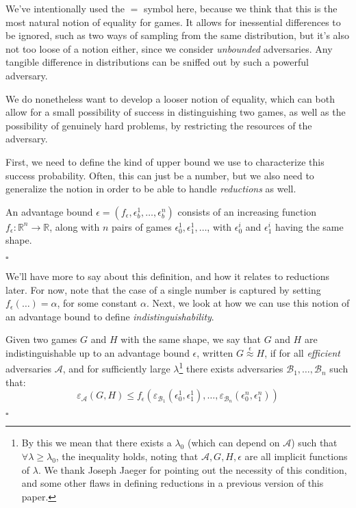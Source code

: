 We've intentionally used the $=$ symbol here, because we think that
this is the most natural notion of equality for games.
It allows for inessential differences to be ignored,
such as two ways of sampling from the same distribution,
but it's also not too loose of a notion either, since we consider
\emph{unbounded} adversaries.
Any tangible difference in distributions can be sniffed out by
such a powerful adversary.

We do nonetheless want to develop a looser notion of equality,
which can both allow for a small possibility of success
in distinguishing two games, as well as the possibility of genuinely
hard problems, by restricting the resources of the adversary.

First, we need to define the kind of upper bound we use
to characterize this success probability.
Often, this can just be a number, but we also need to generalize
the notion in order to be able to handle \emph{reductions} as well.

\begin{definition}
    An advantage bound $\epsilon = (f_\epsilon, \epsilon_b^1, \ldots, \epsilon_b^n)$
    consists of an increasing function $f_\epsilon : \mathbb{R}^n \to \mathbb{R}$,
    along with $n$ pairs of games $\epsilon^1_0, \epsilon^1_1, \ldots$, with
    $\epsilon^i_0$ and $\epsilon^i_1$ having the same shape.

    $\square$
\end{definition}

We'll have more to say about this definition, and how it relates to reductions
later.
For now, note that the case of a single number is captured by setting
$f_\epsilon(\ldots) = \alpha$, for some constant $\alpha$.
Next, we look at how we can use this notion of an advantage bound
to define \emph{indistinguishability}.

\begin{definition}
    Given two games $G$ and $H$ with the same shape,
    we say that $G$ and $H$ are indistinguishable up to an advantage bound $\epsilon$,
    written ${G \overset{\epsilon}{\approx} H}$, if for all \emph{efficient}
    adversaries $\mathcal{A}$, and for sufficiently large $\lambda$\footnote{
        By this we mean that there exists a $\lambda_0$ (which can depend on $\mathcal{A}$) such that $\forall \lambda \geq \lambda_0$, the inequality holds, noting that $\mathcal{A}, G, H, \epsilon$ are all implicit functions of $\lambda$.
        We thank Joseph Jaeger for pointing out the necessity of this condition,
        and some other flaws in defining reductions in a previous version of this paper.
    } there exists adversaries $\mathcal{B}_1, \ldots, \mathcal{B}_n$ such that:
    $$
    \varepsilon_{\mathcal{A}}(G, H) \leq f_\epsilon(\varepsilon_{\mathcal{B}_1}(\epsilon^1_0, \epsilon^1_1), \ldots, \varepsilon_{\mathcal{B}_n}(\epsilon^n_0, \epsilon^n_1))
    $$

    $\square$
\end{definition}

